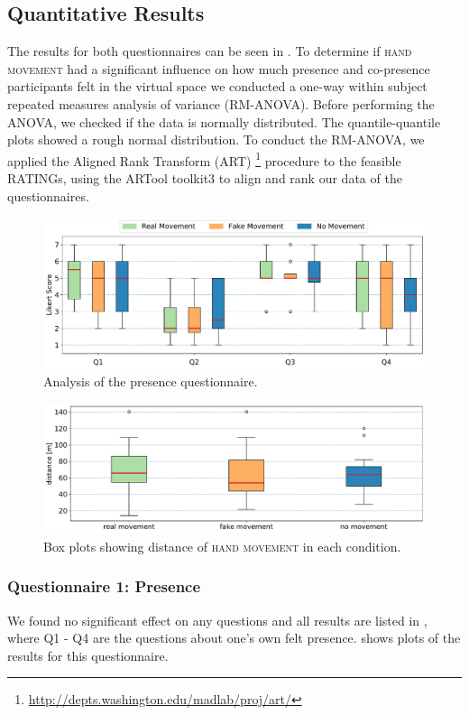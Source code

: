 \documentclass[english,runningheads,a4paper]{llncs}[2018/03/10]
\begin{document}
\subsection{Quantitative Results} 
The results for both questionnaires can be seen in .
To determine if \textsc{hand movement} had a significant influence on how much presence and co-presence participants felt in the virtual space we conducted a one-way within subject repeated measures analysis of variance (RM-ANOVA).
Before performing the ANOVA, we checked if the data is normally distributed. 
The quantile-quantile plots showed a rough normal distribution. 
To conduct the RM-ANOVA, we applied the Aligned Rank Transform (ART) \footnote{\href{http://depts.washington.edu/madlab/proj/art/}{http://depts.washington.edu/madlab/proj/art/}} procedure to the feasible RATINGs, using the ARTool toolkit3 to align and rank our data of the questionnaires. 
\begin{figure}[!h]
    \centering
    \includegraphics[width=\textwidth]{figures/presence.pdf}
    \caption{Analysis of the presence questionnaire.}
    \label{fig:presence}
\end{figure}
\begin{figure}[!ht]
    \centering
    \includegraphics[width=\textwidth]{figures/euclideandistance.pdf}
    \caption{Box plots showing distance of \textsc{hand movement} in each condition.}
    \label{fig:distance_plots}
\end{figure}


\subsubsection{Questionnaire 1: Presence}
We found no significant effect on any questions and all results are listed in , where Q1 - Q4 are the questions about one's own felt presence.
 shows plots of the results for this questionnaire. 
\end{document}

